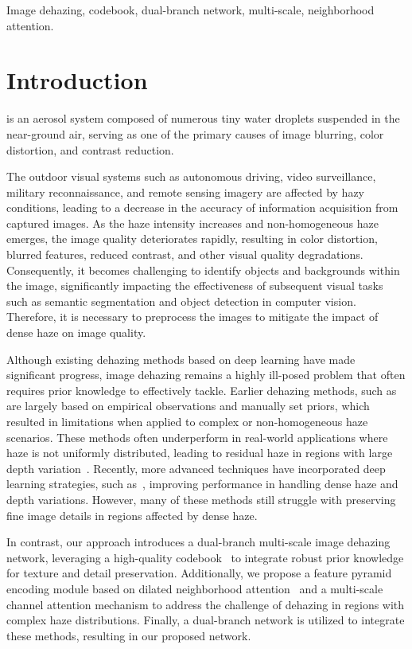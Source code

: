 \documentclass[journal]{IEEEtran}
\begin{document}
\begin{IEEEkeywords}
	Image dehazing, codebook, dual-branch network, multi-scale, neighborhood attention.
\end{IEEEkeywords}


\section{Introduction}
 is an aerosol system composed of numerous tiny water droplets suspended in the near-ground air, serving as one of the primary causes of image blurring, color distortion, and contrast reduction.

The outdoor visual systems such as autonomous driving, video surveillance, military reconnaissance, and remote sensing imagery are affected by hazy conditions, leading to a decrease in the accuracy of information acquisition from captured images. As the haze intensity increases and non-homogeneous haze emerges, the image quality deteriorates rapidly, resulting in color distortion, blurred features, reduced contrast, and other visual quality degradations. Consequently, it becomes challenging to identify objects and backgrounds within the image, significantly impacting the effectiveness of subsequent visual tasks such as semantic segmentation and object detection in computer vision. Therefore, it is necessary to preprocess the images to mitigate the impact of dense haze on image quality.

Although existing dehazing methods based on deep learning have made significant progress, image dehazing remains a highly ill-posed problem that often requires prior knowledge to effectively tackle. Earlier dehazing methods, such as~\cite{he2010single, cai2016dehazenet, li2017aod} are largely based on empirical observations and manually set priors, which resulted in limitations when applied to complex or non-homogeneous haze scenarios. These methods often underperform in real-world applications where haze is not uniformly distributed, leading to residual haze in regions with large depth variation~\cite{liu2019griddehazenet, qin2020ffa}. Recently, more advanced techniques have incorporated deep learning strategies, such as~\cite{guo2022image, song2023vision, yu2021two, jin2022structure, liu2023data}, improving performance in handling dense haze and depth variations. However, many of these methods still struggle with preserving fine image details in regions affected by dense haze.

In contrast, our approach introduces a dual-branch multi-scale image dehazing network, leveraging a high-quality codebook~\cite{esser2021taming} to integrate robust prior knowledge for texture and detail preservation. Additionally, we propose a feature pyramid encoding module based on dilated neighborhood attention~\cite{hassani2022dilated} and a multi-scale channel attention mechanism to address the challenge of dehazing in regions with complex haze distributions. Finally, a dual-branch network is utilized to integrate these methods, resulting in our proposed network.
\end{document}
